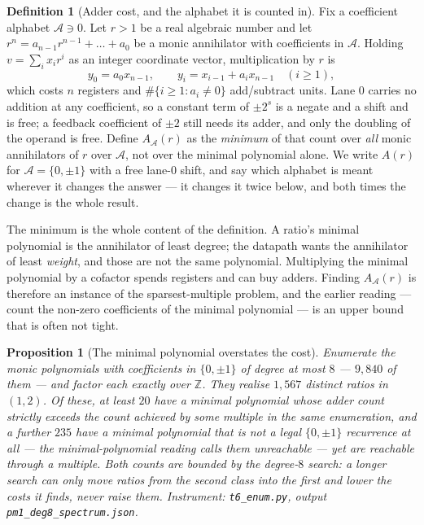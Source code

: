 \documentclass[11pt]{article}
\newtheorem{proposition}[theorem]{Proposition}
\theoremstyle{definition}
\newtheorem{definition}{Definition}
\begin{document}
\begin{definition}[Adder cost, and the alphabet it is counted in]
\label{def:addercost}
Fix a coefficient alphabet $\mathcal{A}\ni0$. Let $r>1$ be a real algebraic
number and let $r^{n}=a_{n-1}r^{n-1}+\dots+a_0$ be a monic annihilator with
coefficients in $\mathcal{A}$. Holding $v=\sum_i x_ir^{i}$ as an integer
coordinate vector, multiplication by $r$ is
\[
  y_0 = a_0x_{n-1},\qquad
  y_i = x_{i-1}+a_ix_{n-1}\quad(i\ge1),
\]
which costs $n$ registers and $\#\{i\ge1:a_i\ne0\}$ add/subtract units. Lane $0$
carries no addition at any coefficient, so a constant term of $\pm2^{s}$ is a
negate and a shift and is free; a feedback coefficient of $\pm2$ still needs its
adder, and only the doubling of the operand is free. Define $A_{\mathcal{A}}(r)$
as the \emph{minimum} of that count over \emph{all} monic annihilators of $r$
over $\mathcal{A}$, not over the minimal polynomial alone. We write $A(r)$ for
$\mathcal{A}=\{0,\pm1\}$ with a free lane-$0$ shift, and say which alphabet is
meant wherever it changes the answer --- it changes it twice below, and both
times the change is the whole result.
\end{definition}

The minimum is the whole content of the definition. A ratio's minimal polynomial
is the annihilator of least degree; the datapath wants the annihilator of least
\emph{weight}, and those are not the same polynomial. Multiplying the minimal
polynomial by a cofactor spends registers and can buy adders. Finding
$A_{\mathcal{A}}(r)$ is therefore an instance of the sparsest-multiple problem,
and the earlier reading --- count the non-zero coefficients of the minimal
polynomial --- is an upper bound that is often not tight.

\begin{proposition}[The minimal polynomial overstates the cost]
\label{prop:sparsemult}
Enumerate the monic polynomials with coefficients in $\{0,\pm1\}$ of degree at
most $8$ --- $9{,}840$ of them --- and factor each exactly over $\mathbb{Z}$.
They realise $1{,}567$ distinct ratios in $(1,2)$. Of these, \emph{at least}
$20$ have a minimal polynomial whose adder count strictly exceeds the count
achieved by some multiple in the same enumeration, and a further $235$ have a
minimal polynomial that is not a legal $\{0,\pm1\}$ recurrence at all --- the
minimal-polynomial reading calls them unreachable --- yet are reachable through
a multiple. Both counts are bounded by the degree-$8$ search: a longer search
can only move ratios from the second class into the first and lower the costs it
finds, never raise them. Instrument: \texttt{t6\_enum.py}, output
\texttt{pm1\_deg8\_spectrum.json}.
\end{proposition}
\end{document}
